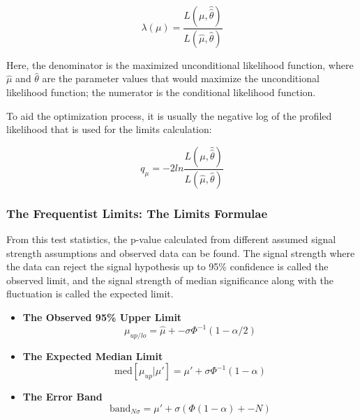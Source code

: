 \begin{equation}
\lambda(\mu) = \frac{L(\mu, \hat{\hat{\theta}})}{L(\hat{\mu}, \hat{\theta})}
\label{eq:profilelikelihood}
\end{equation}

Here, the denominator is the maximized unconditional likelihood function, where $\hat{\mu}$ and $\hat{\theta}$ are the parameter values that would maximize the unconditional likelihood function; the numerator is the conditional likelihood function.

To aid the optimization process, it is usually the negative log of the profiled likelihood that is used for the limits calculation:

\begin{equation}
    q_{\mu} = -2 ln \frac{L(\mu, \hat{\hat{\theta}})}{L(\hat{\mu}, \hat{\theta})}
\label{teststats}
\end{equation}


\subsubsection{The Frequentist Limits: The Limits Formulae}
\label{sec:freqlimits}

From this test statistics, the p-value calculated from different assumed signal strength assumptions and observed data can be found. The signal strength where the data can reject the signal hypothesis up to 95\% confidence is called the observed limit, and the signal strength of median significance along with the fluctuation is called the expected limit. 

\begin{itemize}


\item \textbf{The Observed 95\% Upper Limit}
\begin{equation}
\mu_{up/lo} = \hat{\mu} +- \sigma\Phi^{-1}(1-\alpha/2)
\end{equation}

\item \textbf{The Expected Median Limit}
\begin{equation}
    \mathrm{med}[\mu_{up}|\mu'] = \mu' + \sigma\Phi^{-1}(1-\alpha) 
\end{equation}

\item \textbf{The Error Band}
\begin{equation}
    \mathrm{band}_{N\sigma} = \mu' + \sigma(\Phi(1-\alpha)+-N)
\end{equation}

\end{itemize}


